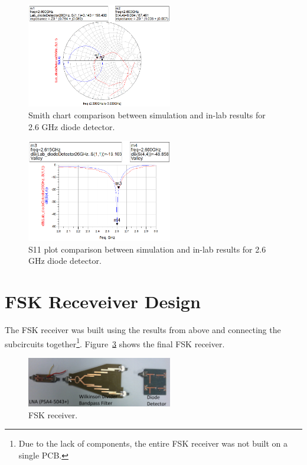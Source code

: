 \documentclass[conference]{IEEEtran}
\begin{document}
\begin{figure}[!htb]
\centering
\includegraphics[width=2.5in]{diode-pics/diodedetectorLab26Smith.png}
\caption{Smith chart comparison between simulation and in-lab results for 2.6 GHz diode detector.}
\label{fig:resultSmith26}
\end{figure}

\begin{figure}[!htb]
\centering
\includegraphics[width=2.5in]{diode-pics/diodedetectorLab26S11.png}
\caption{S11 plot comparison between simulation and in-lab results for 2.6 GHz diode detector.}
\label{fig:resultS1126}
\end{figure}

\section{FSK Receveiver Design}
The FSK receiver was built using the results from above and connecting the subcircuits together\footnote{Due to the lack of components, the entire FSK receiver was not built on a single PCB.}. Figure~\ref{fig:fsk} shows the final FSK receiver.

\begin{figure}[!htb]
\centering
\includegraphics[width=2.5in]{fsk.jpg}
\caption{FSK receiver.}
\label{fig:fsk}
\end{figure}
\end{document}
